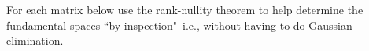 %
%
\ii For each matrix below use the rank-nullity theorem to help determine the fundamental spaces ``by inspection"--i.e., without having to do Gaussian elimination. 

